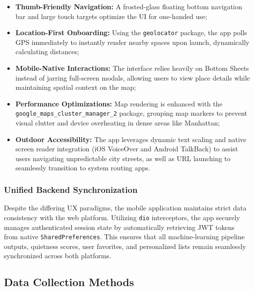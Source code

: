 \documentclass[conference]{IEEEtran}
\begin{document}
\begin{itemize}
      \item \textbf{Thumb-Friendly Navigation:} A frosted-glass floating bottom navigation bar and large touch targets optimize the UI for one-handed use; 
      \item \textbf{Location-First Onboarding:} Using the \texttt{geolocator} package, the app polls GPS immediately to instantly render nearby spaces upon launch, dynamically calculating distances; 
      \item \textbf{Mobile-Native Interactions:} The interface relies heavily on Bottom Sheets instead of jarring full-screen modals, allowing users to view place details while maintaining spatial context on the map; 
      \item \textbf{Performance Optimizations:} Map rendering is enhanced with the \texttt{google\_maps\allowbreak\_cluster\allowbreak\_manager\_2} package, grouping map markers to prevent visual clutter and device overheating in dense areas like Manhattan;
      \item \textbf{Outdoor Accessibility:} The app leverages dynamic text scaling and native screen reader integration (iOS VoiceOver and Android TalkBack) to assist users navigating unpredictable city streets, as well as URL launching to seamlessly transition to system routing apps.
\end{itemize}

\subsubsection{Unified Backend Synchronization}
Despite the differing UX paradigms, the mobile application maintains strict data consistency with the web platform. Utilizing \texttt{dio} interceptors, the app securely manages authenticated session state by automatically retrieving JWT tokens from native \texttt{SharedPreferences}. This ensures that all machine-learning pipeline outputs, quietness scores, user favorites, and personalized lists remain seamlessly synchronized across both platforms.



\subsection{Data Collection Methods}
\end{document}
